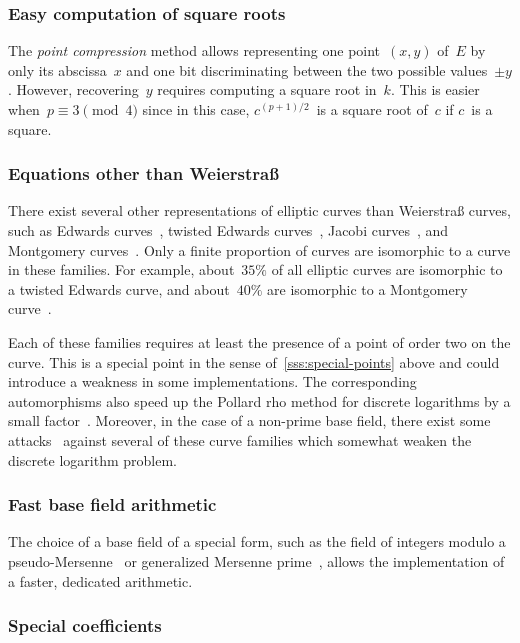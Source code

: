 \documentclass[twocolumn,letterpaper,10pt]{article}
\begin{document}
\subsubsection{Easy computation of square roots}

The \emph{point compression} method allows representing
one point~$(x,y)$ of~$E$ by only its abscissa~$x$ and
one bit discriminating between the two possible values~$±y$.
However, recovering~$y$ requires computing a square root in~$k$.
This is easier when~$p ≡ 3 \pmod{4}$ since
in this case, $c^{(p+1)/2}$~is a square root of~$c$ if $c$~is a square.

\subsubsection{Equations other than Weierstraß}
\label{sss:other-eq}

There exist several other representations of elliptic curves
than Weierstraß curves, such as
Edwards curves~\cite{ams2007edwards},
twisted Edwards curves~\cite{africa2008bbjl},
Jacobi curves~\cite{aaaaec2003bj},
and Montgomery curves~\cite{mathcomp1987montgomery}.
Only a finite proportion of curves are isomorphic
to a curve in these families.
For example, about~$35\%$ of all elliptic curves
are isomorphic to a twisted Edwards curve,
and about~$40\%$ are isomorphic to a Montgomery curve~\cite{sac2011plut}.

Each of these families requires at least
the presence of a point of order two on the curve.
This is a special point in the sense of~\ref{sss:special-points} above
and could introduce a weakness in some implementations.
The corresponding automorphisms also speed up the Pollard rho
method for discrete logarithms by a small factor~\cite{moc2000glv}.
Moreover, in the case of a non-prime base field,
there exist some attacks~\cite{jc2014fghr}
against several of these curve families
which somewhat weaken the discrete logarithm problem.

\subsubsection{Fast base field arithmetic}
\label{sss:special-fast}

The choice of a base field of a special form,
such as the field of integers modulo
a pseudo-Mersenne~\cite{pkc2006bernstein}
or generalized Mersenne prime~\cite{nist2000fips186-2},
allows the implementation of a faster, dedicated arithmetic.

\subsubsection{Special coefficients}
\end{document}
